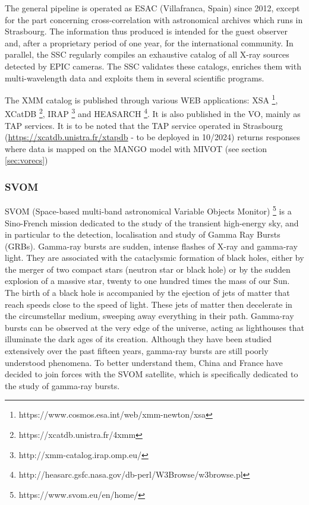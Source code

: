 \documentclass[11pt,a4paper]{ivoa}
\begin{document}
The general pipeline is operated as ESAC (Villafranca, Spain) since 2012, except for the part concerning cross-correlation
with astronomical archives which runs in Strasbourg.
The information thus produced is intended for the guest observer and, after a proprietary period of one year,
for the international community.
In parallel, the SSC regularly compiles an exhaustive catalog of all X-ray sources detected by EPIC cameras.
The SSC validates these catalogs, enriches them with multi-wavelength data and exploits them in several scientific programs.

The XMM catalog is published through various WEB applications: XSA \footnote{https://www.cosmos.esa.int/web/xmm-newton/xsa},
XCatDB \footnote{https://xcatdb.unistra.fr/4xmm}, IRAP \footnote{http://xmm-catalog.irap.omp.eu/} and
HEASARCH \footnote{http://heasarc.gsfc.nasa.gov/db-perl/W3Browse/w3browse.pl}.
It is also published in the VO, mainly as TAP services.
It is to be noted that the TAP service operated in Strasbourg (\url{https://xcatdb.unistra.fr/xtapdb} - to be deployed in 10/2024) returns responses where data is mapped on the MANGO model with MIVOT (see section \ref{sec:vorecs})



\subsubsection{SVOM}

SVOM (Space-based multi-band astronomical Variable Objects Monitor) \footnote{https://www.svom.eu/en/home/}
is a Sino-French mission dedicated
to the study of the transient high-energy sky, and in particular to the detection, localisation and
study of Gamma Ray Bursts (GRBs).
Gamma-ray bursts are sudden, intense flashes of X-ray and gamma-ray light.
They are associated with the cataclysmic formation of black holes, either by the merger of two compact stars
(neutron star or black hole) or by the sudden explosion of a massive star, twenty to one hundred times the mass of our Sun.
The birth of a black hole is accompanied by the ejection of jets of matter that reach speeds close to the speed of light.
These jets of matter then decelerate in the circumstellar medium, sweeping away everything in their path.
Gamma-ray bursts can be observed at the very edge of the universe, acting as lighthouses that illuminate
the dark ages of its creation. Although they have been studied extensively over the past fifteen years,
gamma-ray bursts are still poorly understood phenomena. To better understand them, China and France have decided
to join forces with the SVOM satellite, which is specifically dedicated to the study of gamma-ray bursts.
\end{document}
